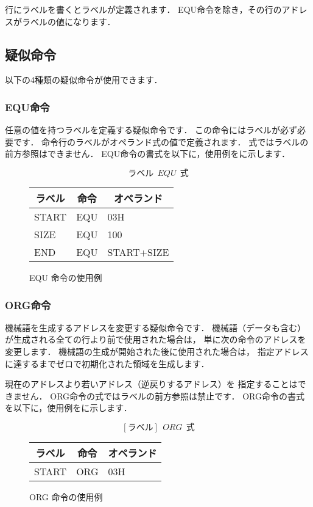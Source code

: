 行にラベルを書くとラベルが定義されます．
EQU命令を除き，その行のアドレスがラベルの値になります．

\subsection{疑似命令}
以下の4種類の疑似命令が使用できます．

\subsubsection{EQU命令}
任意の値を持つラベルを定義する疑似命令です．
この命令にはラベルが必ず必要です．
命令行のラベルがオペランド式の値で定義されます．
式ではラベルの前方参照はできません．
EQU命令の書式を以下に，使用例をに示します．

{\small\[ ラベル~~EQU~~式 \]}

\begin{figure}[btp]
\begin{center}
{\tt\small\begin{tabular}{|l|l|l|}\hline
\multicolumn{1}{|c|}{ラベル} & 
        \multicolumn{1}{c|}{命令} & \multicolumn{1}{c|}{オペランド} \\\hline
START & EQU & 03H \\
SIZE  & EQU & 100 \\
END   & EQU & START+SIZE \\\hline
\end{tabular}}
\caption{EQU 命令の使用例}
\label{fig:appB:equ}
\end{center}
\end{figure}

\subsubsection{ORG命令}
機械語を生成するアドレスを変更する疑似命令です．
機械語（データも含む）が生成される全ての行より前で使用された場合は，
単に次の命令のアドレスを変更します．
機械語の生成が開始された後に使用された場合は，
指定アドレスに達するまでゼロで初期化された領域を生成します．

現在のアドレスより若いアドレス（逆戻りするアドレス）を
指定することはできません．
ORG命令の式ではラベルの前方参照は禁止です．
ORG命令の書式を以下に，使用例をに示します．

{\small\[ [ラベル]~~ORG~~式\]}

\begin{figure}[btp]
\begin{center}
{\tt\small\begin{tabular}{|l|l|l|}\hline
\multicolumn{1}{|c|}{ラベル} & 
        \multicolumn{1}{c|}{命令} & \multicolumn{1}{c|}{オペランド} \\\hline
START & ORG & 03H \\\hline
\end{tabular}}
\caption{ORG 命令の使用例}
\label{fig:appB:org}
\end{center}
\end{figure}

